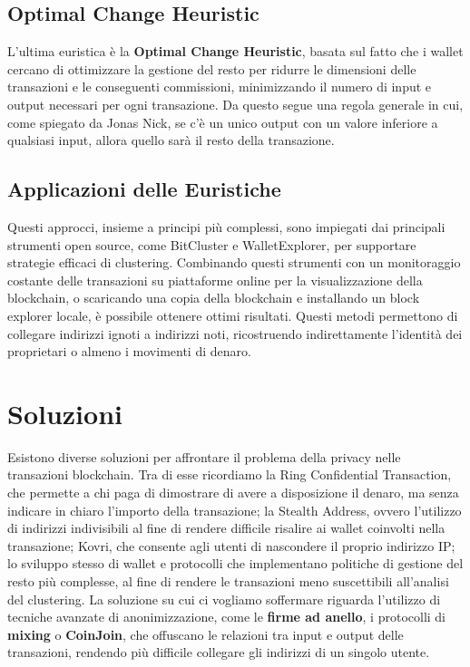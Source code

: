 \subsection{Optimal Change Heuristic}

L'ultima euristica è la \textbf{Optimal Change Heuristic}, basata sul fatto che i wallet cercano di ottimizzare la gestione del resto per ridurre le dimensioni delle transazioni e le conseguenti commissioni, minimizzando il numero di input e output necessari per ogni transazione. Da questo segue una regola generale in cui, come spiegato da Jonas Nick, se c'è un unico output con un valore inferiore a qualsiasi input, allora quello sarà il resto della transazione.

\subsection{Applicazioni delle Euristiche}

Questi approcci, insieme a principi più complessi, sono impiegati dai principali strumenti open source, come BitCluster e WalletExplorer, per supportare strategie efficaci di clustering. Combinando questi strumenti con un monitoraggio costante delle transazioni su piattaforme online per la visualizzazione della blockchain, o scaricando una copia della blockchain e installando un block explorer locale, è possibile ottenere ottimi risultati. Questi metodi permettono di collegare indirizzi ignoti a indirizzi noti, ricostruendo indirettamente l'identità dei proprietari o almeno i movimenti di denaro.

\section{Soluzioni}
Esistono diverse soluzioni per affrontare il problema della privacy nelle transazioni blockchain. Tra di esse ricordiamo la Ring Confidential Transaction, che permette a chi paga di dimostrare di avere a disposizione il denaro, ma senza indicare in chiaro l'importo della transazione; la Stealth Address, ovvero l'utilizzo di indirizzi indivisibili al fine di rendere difficile risalire ai wallet coinvolti nella transazione; Kovri, che consente agli utenti di nascondere il proprio indirizzo IP; lo sviluppo stesso di wallet e protocolli che implementano politiche di gestione del resto più complesse, al fine di rendere le transazioni meno suscettibili all'analisi del clustering. La soluzione su cui ci vogliamo soffermare riguarda l'utilizzo di tecniche avanzate di anonimizzazione, come le \textbf{firme ad anello}, i protocolli di \textbf{mixing} o \textbf{CoinJoin}, che offuscano le relazioni tra input e output delle transazioni, rendendo più difficile collegare gli indirizzi di un singolo utente.

